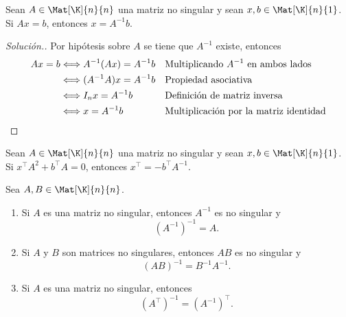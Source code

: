 \documentclass[compacto,10pt]{pubciencias-notas}
\begin{document}
\begin{ejem}\hspace{0pt} 
Sean $A\in\Mat[\K]{n}{n}$ una matriz no singular y sean $x, b \in \Mat[\K]{n}{1}$. Si $Ax = b$, entonces $x = A^{- 1}b$.

\begin{proof}[Solución.]\hspace{0pt} Por hipótesis sobre $A$ se tiene que $A^{-1}$ existe, entonces
\begin{align*}
    Ax = b
    &\Longleftrightarrow A^{-1}(Ax) = A^{-1}b
    && \text{Multiplicando $A^{- 1}$ en ambos lados}\\
    &\Longleftrightarrow (A^{-1}A)x = A^{-1}b
    && \text{Propiedad asociativa}\\
    &\Longleftrightarrow I_{n}x = A^{-1}b
    && \text{Definición de matriz inversa}\\
    &\Longleftrightarrow x = A^{-1}b
    && \text{Multiplicación por la matriz identidad}\qedhere
\end{align*}
\end{proof}
\end{ejem}

\begin{ejer}\hspace{0pt} 
Sean $A\in\Mat[\K]{n}{n}$ una matriz no singular y sean $x, b \in \Mat[\K]{n}{1}$. Si $x^{\intercal}A^{2} + b^{\intercal}A = 0$, entonces $x^{\intercal} = - b^{\intercal}A^{- 1}$.
\end{ejer}

\begin{teo}\label{Sem03Clas02PropInv}
    Sea $A, B \in \Mat[\K]{n}{n}$. 
    \begin{enumerate}
    \item[$a)$] 
        Si $A$ es una matriz no singular, entonces $A^{-1}$ es no singular y 
        \[ 
            (A^{-1})^{-1} = A.
        \]
    \item[$b)$] 
        Si $A$ y $B$ son matrices no singulares, entonces $AB$ es no singular y 
        \[ 
            (AB)^{-1} = B^{-1}A^{-1}.
        \]
    \item[$c)$] 
        Si $A$ es una matriz no singular, entonces
        \[
            {(A^\intercal)}^{-1} = {(A^{-1})}^\intercal.
        \]
    \end{enumerate}
\end{teo}

\end{document}
